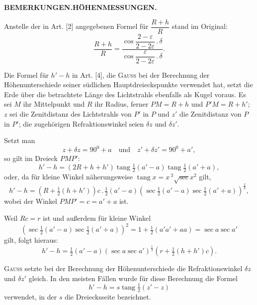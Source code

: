 \par\clearpage
\noindent\null\hfill{\small\textbf{BEMERKUNGEN.\quad HÖHENMESSUNGEN.}}\hfill{}\par\medskip
\begingroup
\footnotesize
\setlength{\abovedisplayskip}{5pt}\setlength{\belowdisplayskip}{5pt}
\par\noindent\hspace*{\parindent}Anstelle der in Art. [2] angegebenen Formel für
\(\dfrac{R+h}{R}\) stand im Original:
\[
\frac{R+h}{R}=
\frac{\cos\dfrac{2-\varepsilon}{2-2\varepsilon}\mathbin{.}\delta}
     {\cos\dfrac{\varepsilon}{2-2\varepsilon}\mathbin{.}\delta}.
\]
\par\noindent\hspace*{\parindent}Die Formel für \(h'-h\) in Art. [4], die \textsc{Gauss} bei der
Berechnung der Höhenunterschiede seiner südlichen Hauptdreieckspunkte verwendet hat,
setzt die Erde über die betrachtete Länge des Lichtstrahls ebenfalls
als Kugel voraus. Es sei \(M\) ihr Mittelpunkt und \(R\) ihr Radius,
ferner \(PM=R+h\) und \(P'M=R+h'\); \(z\) sei die Zenitdistanz des Lichtstrahls
von \(P'\) in \(P\) und \(z'\) die Zenitdistanz von \(P\) in \(P'\); die zugehörigen
Refraktionswinkel seien \(\delta z\) und \(\delta z'\).
\par\noindent\hspace*{\parindent}Setzt man
\[
z+\delta z=90^{0}+a\quad\text{und}\quad z'+\delta z'=90^{0}+a',
\]
\noindent so gilt im Dreieck \(PMP'\):
\[
h'-h=(2R+h+h')\operatorname{tang}\tfrac12(a'-a)\operatorname{tang}\tfrac12(a'+a),
\]
\noindent oder, da für kleine Winkel näherungsweise \(\operatorname{tang}x=x\,{}^3\!\surd\sec x^2\) gilt,
\[
h'-h=(R+\tfrac12(h+h'))c\mathbin{.}\tfrac12(a'-a)
(\sec\tfrac12(a'-a)\sec\tfrac12(a'+a))^{\frac23},
\]
\noindent wobei der Winkel \(PMP'=c=a'+a\) ist.
\par\noindent\hspace*{\parindent}Weil \(Rc=r\) ist und außerdem für kleine Winkel
\[
(\sec\tfrac12(a'-a)\sec\tfrac12(a'+a))^2
=1+\tfrac12(a'a'+aa)=\sec a\sec a'
\]
\noindent gilt, folgt hieraus:
\[
h'-h=\tfrac12(a'-a)(\sec a\sec a')^{\frac13}(r+\tfrac12(h+h')c).
\]
\par\noindent\hspace*{\parindent}\textsc{Gauss} setzte bei der Berechnung der Höhenunterschiede
die Refraktionswinkel \(\delta z\) und \(\delta z'\) gleich.
In den meisten Fällen wurde für diese Berechnung die Formel
\[
h'-h=s\operatorname{tang}\tfrac12(z'-z)
\]
\noindent verwendet, in der \(s\) die Dreiecksseite bezeichnet.
